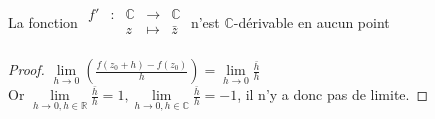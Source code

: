 \documentclass[]{report}
\begin{document}
\begin{prop}{}{}
La fonction $\begin{array}{ccccc}
f' & : & \mathbb{C} & \to & \mathbb{C} \\
 & & z & \mapsto & \bar{z} \\
\end{array}$ n'est $\mathbb{C}$-dérivable en aucun point
\end{prop}

\begin{proof}{}{}
    $\lim\limits_{h \to 0} \left(\frac{f(z_0+h)-f(z_0)}{h}\right)=\lim\limits_{h \to 0} \frac{\bar{h}}{h}$\\
    Or $\lim\limits_{h \to 0,h\in \mathbb{R}} \frac{\bar{h}}{h}=1,\lim\limits_{h \to 0,h\in \mathbb{C}} \frac{\bar{h}}{h}=-1 $, il n'y a donc pas de limite.
\end{proof}
\end{document}

